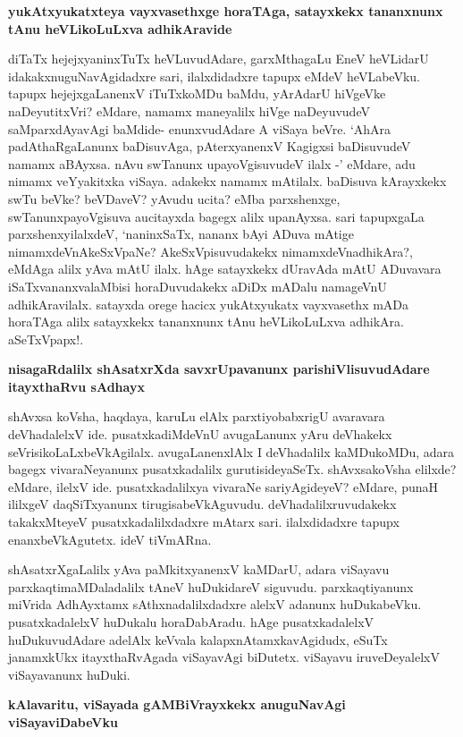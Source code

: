 {\bigskip
\noindent
{\large\bf yukAtxyukatxteya vayxvasethxge horaTAga, satayxkekx tananxnunx tAnu heVLikoLuLxva adhikAravide}}\label{249}
\medskip

\noindent
diTaTx hejejxyaninxTuTx heVLuvudAdare, garxMthagaLu EneV heVLidarU idakakxnuguNa\-vAgidadxre sari, ilalx\-didadxre tapupx eMdeV heVLabeVku. tapupx hejejxgaLanenxV iTuTxkoMDu baMdu, yArAdarU hiVgeVke naDeyu\-titxVri? eMdare, namamx maneyalilx hiVge naDeyuvudeV saMparxdAyavAgi baMdide- enunxvudAdare A viSaya beVre. `AhAra padAthaRgaLanunx baDisuvAga, pAterxyanenxV Kagigxsi baDisuvudeV namamx aBAyxsa. nAvu swTanunx upayoVgisuvudeV ilalx -' eMdare, adu nimamx veYyakitxka viSaya. adakekx namamx mAtilalx.\- baDisuva kArayxkekx swTu beVke? beVDaveV? yAvudu ucita? eMba parxshenxge, swTanunxpayoVgisuva auci\-tayxda bagegx alilx upanAyxsa. sari tapupxgaLa parxshenxyilalxdeV, `naninxSaTx, nananx bAyi ADuva mAtige nimamxdeVnA\-keSxVpaNe? AkeSxVpisuvudakekx nimamxdeVnadhikAra?, eMdAga alilx yAva mAtU ilalx. hAge satayxkekx dUravAda mAtU ADuvavara iSaTxvananxvalaMbisi horaDuvudakekx aDiDx mADalu namageVnU adhikAravilalx. satayxda orege hacicx yukAtxyukatx vayxvasethx mADa horaTAga alilx satayxkekx tananxnunx tAnu heVLikoLuLxva adhikAra. aSeTxVpapx!.

{\bigskip
\noindent
{\large\bf nisagaRdalilx shAsatxrXda savxrUpavanunx parishiVlisuvudAdare itayxthaRvu sAdhayx}}\label{page249}
\medskip

\noindent
shAvxsa koVsha, haqdaya, karuLu elAlx parxtiyobabxrigU avaravara deVhadalelxV ide. pusatxkadiMdeVnU avugaLanunx yAru deVhakekx seVrisikoLaLxbeVkAgilalx. avugaLanenxlAlx I deVhadalilx kaMDukoMDu, adara bagegx vivaraNeyanunx pusatxkadalilx gurutisideyaSeTx. shAvxsakoVsha elilxde? eMdare, ilelxV ide. pusatxkadalilxya vivaraNe sariyAgideyeV? eMdare, punaH ililxgeV daqSiTxyanunx tirugisabeVkAguvudu. deVhadalilxruvudakekx takakxMteyeV pusatxkadalilxdadxre mAtarx sari. ilalxdidadxre tapupx enanxbeVkAgutetx. ideV tiVmARna.

shAsatxrXgaLalilx yAva paMkitxyanenxV kaMDarU, adara viSayavu parxkaqtimaMDaladalilx tAneV huDuki\-dareV siguvudu. parxkaqtiyanunx miVrida AdhAyxtamx sAthxnadalilxdadxre alelxV adanunx huDukabeVku. pusatxka\-dalelxV huDu\-kalu horaDabAradu. hAge pusatxkadalelxV huDukuvudAdare adelAlx keVvala kalapxnAtamxka\-vAgidudx, eSuTx janamxkUkx itayxthaRvAgada viSayavAgi biDutetx. viSayavu iruveDeyalelxV viSayavanunx huDuki.

{\bigskip
\noindent
{\large\bf kAlavaritu, viSayada gAMBiVrayxkekx anuguNavAgi viSayaviDabeVku}}\label{page250}
\medskip

